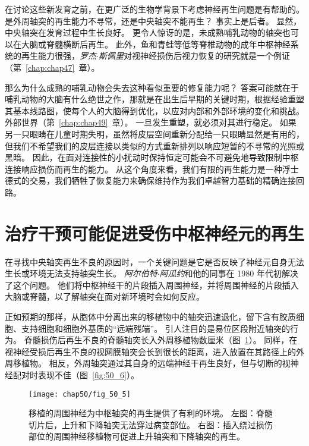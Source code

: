 在讨论这些新发育之前，在更广泛的生物学背景下考虑神经再生问题是有帮助的。
是外周轴突的再生能力不寻常，还是中央轴突不能再生？ 
事实上是后者。
显然，中央轴突在发育过程中生长良好。
更令人惊讶的是，未成熟哺乳动物的轴突也可以在大脑或脊髓横断后再生。
此外，鱼和青蛙等低等脊椎动物的成年中枢神经系统的再生能力很强，\textit{罗杰$\cdot$斯佩里}对视神经损伤后视力恢复的研究就是一个例证（第~\ref{chap:chap47}~章）。


那么为什么成熟的哺乳动物会失去这种看似重要的修复能力呢？
答案可能就在于哺乳动物的大脑有什么绝世之作，那就是在出生后早期的关键时期，根据经验重塑其基本线路图，使每个人的大脑得到优化，以应对内部和外部环境的变化和挑战。
外部世界（第~\ref{chap:chap49}~章）。
一旦发生重塑，就必须对其进行稳定。
如果另一只眼睛在儿童时期失明，虽然将皮层空间重新分配给一只眼睛显然是有用的，但我们不希望我们的皮层连接以类似的方式重新排列以响应短暂的不寻常的光照或黑暗。
因此，在面对连接性的小扰动时保持恒定可能会不可避免地导致限制中枢连接响应损伤而再生的能力。
从这个角度来看，我们有限的再生能力是一种浮士德式的交易，我们牺牲了恢复能力来确保维持作为我们卓越智力基础的精确连接回路。



\section{治疗干预可能促进受伤中枢神经元的再生}

在寻找中央轴突再生不良的原因时，一个关键问题是它是否反映了神经元自身无法生长或环境无法支持轴突生长。
\textit{阿尔伯特$\cdot$阿瓜约}和他的同事在 1980 年代初解决了这个问题。
他们将中枢神经干的片段插入周围神经，并将周围神经的片段插入大脑或脊髓，以了解轴突在面对新环境时会如何反应。


正如预期的那样，从胞体中分离出来的移植物中的轴突迅速退化，留下含有胶质细胞、支持细胞和细胞外基质的“远端残端”。
引人注目的是易位区段附近轴突的行为。
脊髓损伤后再生不良的脊髓轴突长入外周移植物数厘米（图~\ref{fig:50_5}）。
同样，在视神经受损后再生不良的视网膜轴突会长到很长的距离，进入放置在其路径上的外周移植物。
相反，外周轴突通过其自身的远端神经干再生良好，但与切断的视神经配对时表现不佳（图~\ref{fig:50_6}）。


\begin{figure}[htbp]
	\centering
	\texttt{[image: chap50/fig\_50\_5]}
	\caption{移植的周围神经为中枢轴突的再生提供了有利的环境。
		左图：脊髓切片后，上升和下降轴突无法穿过病变部位。
		右图：插入绕过损伤部位的周围神经移植物可促进上升轴突和下降轴突的再生\cite{david1981axonal}。}
	\label{fig:50_5}
\end{figure}


